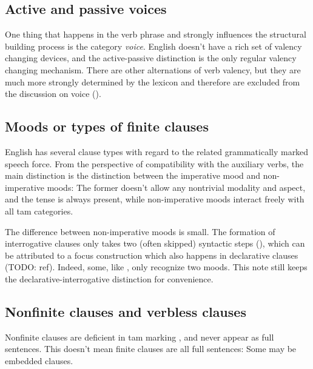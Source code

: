 \documentclass[UTF8, a4paper, oneside, scheme=plain]{ctexrep}
\newcommand*{\citepage}[1]{p.~{#1}}
\begin{document}
\subsection{Active and passive voices}

One thing that happens in the verb phrase 
and strongly influences the structural building process is the category \emph{voice}.
English doesn't have a rich set of valency changing devices,
and the active-passive distinction is the only regular valency changing mechanism.
There are other alternations of verb valency, 
but they are much more strongly determined by the lexicon 
and therefore are excluded from the discussion on voice ().

\subsection{Moods or types of finite clauses}\label{sec:moods}

English has several clause types with regard to the related grammatically marked speech force.
From the perspective of compatibility with the auxiliary verbs,
the main distinction is the distinction between the imperative mood and non-imperative moods:
The former doesn't allow any nontrivial modality and aspect,
and the tense is always present,
while non-imperative moods interact freely with all \acs{tam} categories.

The difference between non-imperative moods is small.
The formation of interrogative clauses 
only takes two (often skipped) syntactic steps 
(),
which can be attributed to a focus construction which also happens in declarative clauses (TODO: ref).
Indeed, some, like \citet[\citepage{25}]{dixon2005semantic}, only recognize two moods.
This note still keeps the declarative-interrogative distinction 
for convenience.

\subsection{Nonfinite clauses and verbless clauses}\label{sec:simple-clause.nonfinite-clause}

Nonfinite clauses are deficient in \acs{tam} marking 
\citep[\citepage{1174}, {[5-7]}]{cgel},
and never appear as full sentences.
This doesn't mean finite clauses are all full sentences:
Some may be embedded clauses.
\end{document}
